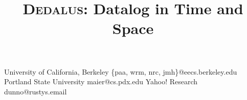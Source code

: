 \documentclass{sigplanconf}
\def\lang{\textsc{Dedalus}\xspace}
\begin{document}
\copyrightdata{[to be supplied]}

\title{{\huge{\bf\lang}}:
Datalog in Time and Space} 
%


           {University of California, Berkeley}
           {\{paa, wrm, nrc, jmh\}@eecs.berkeley.edu}
           {Portland State University}
           {maier@cs.pdx.edu}
           {Yahoo! Research}
           {dunno@rustys.email}



\maketitle
\end{document}
